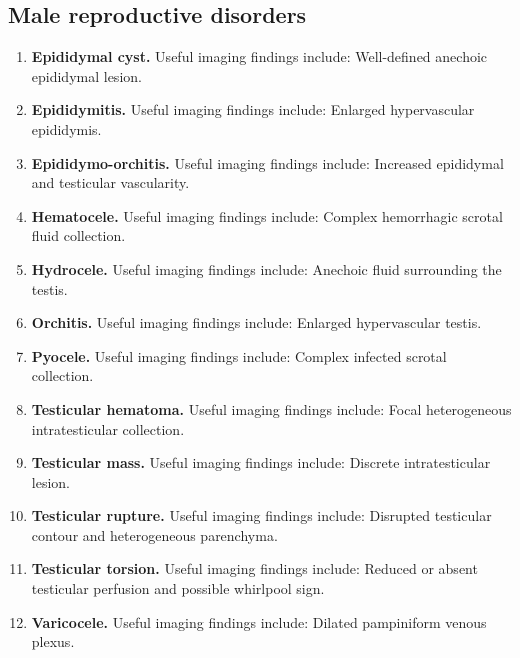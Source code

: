 \subsection{Male reproductive disorders}
\begin{enumerate}[leftmargin=*,itemsep=0.45em,topsep=0.4em]
\item \textbf{Epididymal cyst.} Useful imaging findings include: Well-defined anechoic epididymal lesion.
\item \textbf{Epididymitis.} Useful imaging findings include: Enlarged hypervascular epididymis.
\item \textbf{Epididymo-orchitis.} Useful imaging findings include: Increased epididymal and testicular vascularity.
\item \textbf{Hematocele.} Useful imaging findings include: Complex hemorrhagic scrotal fluid collection.
\item \textbf{Hydrocele.} Useful imaging findings include: Anechoic fluid surrounding the testis.
\item \textbf{Orchitis.} Useful imaging findings include: Enlarged hypervascular testis.
\item \textbf{Pyocele.} Useful imaging findings include: Complex infected scrotal collection.
\item \textbf{Testicular hematoma.} Useful imaging findings include: Focal heterogeneous intratesticular collection.
\item \textbf{Testicular mass.} Useful imaging findings include: Discrete intratesticular lesion.
\item \textbf{Testicular rupture.} Useful imaging findings include: Disrupted testicular contour and heterogeneous parenchyma.
\item \textbf{Testicular torsion.} Useful imaging findings include: Reduced or absent testicular perfusion and possible whirlpool sign.
\item \textbf{Varicocele.} Useful imaging findings include: Dilated pampiniform venous plexus.
\end{enumerate}

